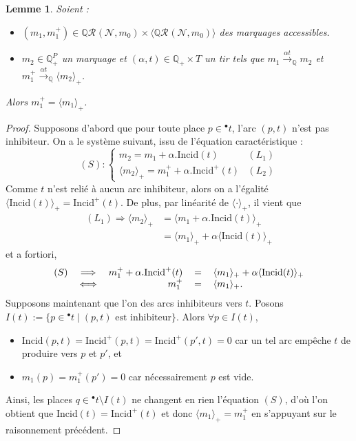 \documentclass{article}
\newtheorem{lemma}{Lemme}
\theoremstyle{remark}
\theoremstyle{remark}
\newcommand{\preb}[1]{{}^\bullet #1}
\newcommand{\reach}[3][]{\mathcal{R}^{#1}(\mathcal{#2}, #3)}
\newcommand{\creach}[3][]{\mathbb{Q}\reach[#1]{#2}{#3}}
\newcommand{\reaches}[1][]{\xrightarrow{#1}}
\newcommand{\creaches}[1][]{\reaches[#1]_{\mathbb{Q}}}
\newcommand{\extend}[1][\cdot]{\langle #1 \rangle}
\newcommand{\coextend}[1][\cdot]{\extend[#1]_+}
\newcommand{\incid}{\mathrm{Incid}}
\begin{document}
\begin{lemma}
    \label{lemma:net-balance-preservation}
    Soient : \begin{itemize}
        \item $(m_1, m_1^+) \in \creach{N}{m_0} \times \extend[\creach{N}{m_0}]$ des marquages accessibles.
        \item $m_2 \in \mathbb{Q}_+^P$ un marquage et $(\alpha, t) \in \mathbb{Q}_+ \times T$ un tir tels que $m_1 \creaches[\alpha t] m_2$ et $m_1^+ \creaches[\alpha t] \coextend[m_2]$.
    \end{itemize}
    Alors $m_1^+ = \coextend[m_1]$.
\end{lemma}

\begin{proof}
    Supposons d'abord que pour toute place $p \in \preb{t}$, l'arc $(p, t)$ n'est pas inhibiteur.
    On a le système suivant, issu de l'équation caractéristique : \begin{equation*} (S) :
        \begin{cases}
            m_2 = m_1 + \alpha.\incid(t)                & (L_1)\\
            \coextend[m_2] = m_1^+ + \alpha.\incid^+(t) & (L_2)
        \end{cases}
    \end{equation*}
    Comme $t$ n'est relié à aucun arc inhibiteur, alors on a l'égalité $\coextend[\incid(t)] = \incid^+(t)$. De plus, par linéarité de $\coextend$, il vient que \begin{align*}
        (L_1) \Longrightarrow \coextend[m_2] & = \coextend[m_1 + \alpha.\incid(t)] \\
                                             & = \coextend[m_1] + \alpha \coextend[\incid(t)]
    \end{align*}
    et a fortiori, \begin{equation*}
        \begin{tabular}{r c r c l}
                    $(S)$ & $\Longrightarrow$     & $m_1^+ + \alpha.\incid^+(t)$ & $=$ & $\coextend[m_1] + \alpha \coextend[\incid(t)]$ \\
                          & $\Longleftrightarrow$ &                      $m_1^+$ & $=$ & $\coextend[m_1]$.
        \end{tabular}
    \end{equation*}
    Supposons maintenant que l'on des arcs inhibiteurs vers $t$. Posons $I(t) := \{p \in \preb{t} \mid (p, t) \text{ est inhibiteur}\}$. Alors $\forall p \in I(t)$, \begin{itemize}
        \item $\incid(p, t) = \incid^+(p, t) = \incid^+(p', t) = 0$ car un tel arc empêche $t$ de produire vers $p$ et $p'$, et
        \item $m_1(p) = m_1^+(p') = 0$ car nécessairement $p$ est vide.
    \end{itemize}
    Ainsi, les places $q \in \preb{t} \setminus I(t)$ ne changent en rien l'équation $(S)$, d'où l'on obtient que $\incid(t) = \incid^+(t)$ et donc $\coextend[m_1] = m_1^+$ en s'appuyant sur le raisonnement précédent.
\end{proof}
\end{document}
